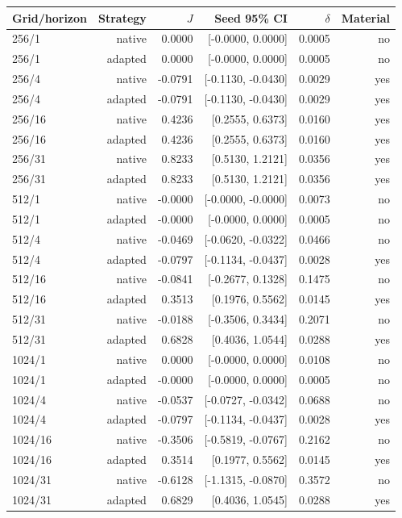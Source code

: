\begin{tabular}{lrrrrr}
\toprule
Grid/horizon & Strategy & $J$ & Seed 95\% CI & $\delta$ & Material \\
\midrule
256/1 & native & 0.0000 & [-0.0000, 0.0000] & 0.0005 & no \\
256/1 & adapted & 0.0000 & [-0.0000, 0.0000] & 0.0005 & no \\
256/4 & native & -0.0791 & [-0.1130, -0.0430] & 0.0029 & yes \\
256/4 & adapted & -0.0791 & [-0.1130, -0.0430] & 0.0029 & yes \\
256/16 & native & 0.4236 & [0.2555, 0.6373] & 0.0160 & yes \\
256/16 & adapted & 0.4236 & [0.2555, 0.6373] & 0.0160 & yes \\
256/31 & native & 0.8233 & [0.5130, 1.2121] & 0.0356 & yes \\
256/31 & adapted & 0.8233 & [0.5130, 1.2121] & 0.0356 & yes \\
512/1 & native & -0.0000 & [-0.0000, -0.0000] & 0.0073 & no \\
512/1 & adapted & -0.0000 & [-0.0000, 0.0000] & 0.0005 & no \\
512/4 & native & -0.0469 & [-0.0620, -0.0322] & 0.0466 & no \\
512/4 & adapted & -0.0797 & [-0.1134, -0.0437] & 0.0028 & yes \\
512/16 & native & -0.0841 & [-0.2677, 0.1328] & 0.1475 & no \\
512/16 & adapted & 0.3513 & [0.1976, 0.5562] & 0.0145 & yes \\
512/31 & native & -0.0188 & [-0.3506, 0.3434] & 0.2071 & no \\
512/31 & adapted & 0.6828 & [0.4036, 1.0544] & 0.0288 & yes \\
1024/1 & native & 0.0000 & [-0.0000, 0.0000] & 0.0108 & no \\
1024/1 & adapted & -0.0000 & [-0.0000, 0.0000] & 0.0005 & no \\
1024/4 & native & -0.0537 & [-0.0727, -0.0342] & 0.0688 & no \\
1024/4 & adapted & -0.0797 & [-0.1134, -0.0437] & 0.0028 & yes \\
1024/16 & native & -0.3506 & [-0.5819, -0.0767] & 0.2162 & no \\
1024/16 & adapted & 0.3514 & [0.1977, 0.5562] & 0.0145 & yes \\
1024/31 & native & -0.6128 & [-1.1315, -0.0870] & 0.3572 & no \\
1024/31 & adapted & 0.6829 & [0.4036, 1.0545] & 0.0288 & yes \\
\bottomrule
\end{tabular}
